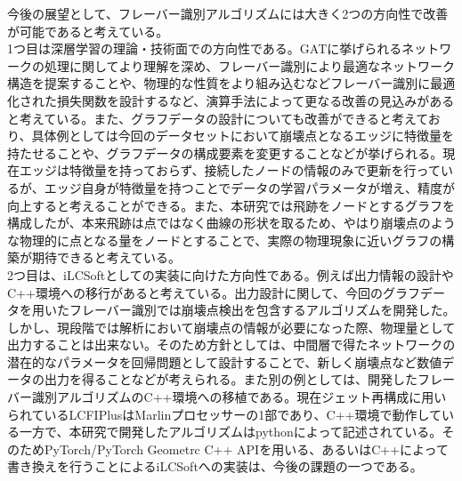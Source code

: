 \hfill
今後の展望として、フレーバー識別アルゴリズムには大きく2つの方向性で改善が可能であると考えている。\\
1つ目は深層学習の理論・技術面での方向性である。GATに挙げられるネットワークの処理に関してより理解を深め、フレーバー識別により最適なネットワーク構造を提案することや、物理的な性質をより組み込むなどフレーバー識別に最適化された損失関数を設計するなど、演算手法によって更なる改善の見込みがあると考えている。また、グラフデータの設計についても改善ができると考えており、具体例としては今回のデータセットにおいて崩壊点となるエッジに特徴量を持たせることや、グラフデータの構成要素を変更することなどが挙げられる。現在エッジは特徴量を持っておらず、接続したノードの情報のみで更新を行っているが、エッジ自身が特徴量を持つことでデータの学習パラメータが増え、精度が向上すると考えることができる。また、本研究では飛跡をノードとするグラフを構成したが、本来飛跡は点ではなく曲線の形状を取るため、やはり崩壊点のような物理的に点となる量をノードとすることで、実際の物理現象に近いグラフの構築が期待できると考えている。\\
2つ目は、iLCSoftとしての実装に向けた方向性である。例えば出力情報の設計やC++環境への移行があると考えている。出力設計に関して、今回のグラフデータを用いたフレーバー識別では崩壊点検出を包含するアルゴリズムを開発した。しかし、現段階では解析において崩壊点の情報が必要になった際、物理量として出力することは出来ない。そのため方針としては、中間層で得たネットワークの潜在的なパラメータを回帰問題として設計することで、新しく崩壊点など数値データの出力を得ることなどが考えられる。また別の例としては、開発したフレーバー識別アルゴリズムのC++環境への移植である。現在ジェット再構成に用いられているLCFIPlusはMarlinプロセッサーの1部であり、C++環境で動作している一方で、本研究で開発したアルゴリズムはpythonによって記述されている。そのためPyTorch/PyTorch Geometrc C++ APIを用いる、あるいはC++によって書き換えを行うことによるiLCSoftへの実装は、今後の課題の一つである。\\
